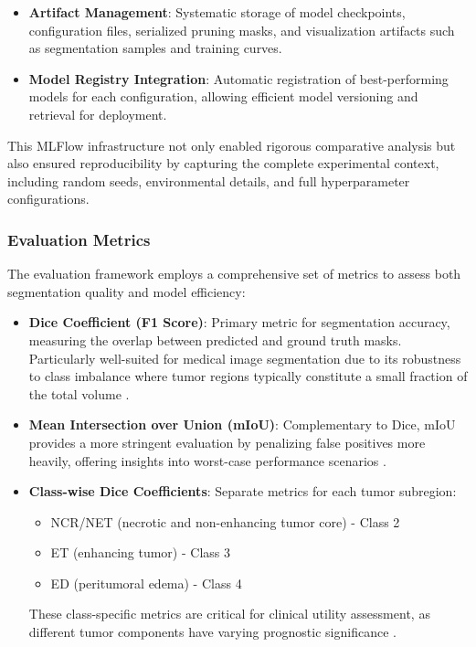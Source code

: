 \documentclass[12pt,a4paper]{article}
\begin{document}
\begin{enumerate}
\begin{itemize}
    \item \textbf{Artifact Management}: Systematic storage of model checkpoints, configuration files, serialized pruning masks, and visualization artifacts such as segmentation samples and training curves.
    
    \item \textbf{Model Registry Integration}: Automatic registration of best-performing models for each configuration, allowing efficient model versioning and retrieval for deployment.
\end{itemize}

This MLFlow infrastructure not only enabled rigorous comparative analysis but also ensured reproducibility by capturing the complete experimental context, including random seeds, environmental details, and full hyperparameter configurations.

\subsubsection{Evaluation Metrics}
The evaluation framework employs a comprehensive set of metrics to assess both segmentation quality and model efficiency:

\begin{itemize}
    \item \textbf{Dice Coefficient (F1 Score)}: Primary metric for segmentation accuracy, measuring the overlap between predicted and ground truth masks. Particularly well-suited for medical image segmentation due to its robustness to class imbalance where tumor regions typically constitute a small fraction of the total volume \cite{Sudre2017}.
    
    \item \textbf{Mean Intersection over Union (mIoU)}: Complementary to Dice, mIoU provides a more stringent evaluation by penalizing false positives more heavily, offering insights into worst-case performance scenarios \cite{Wang2023Review}.
    
    \item \textbf{Class-wise Dice Coefficients}: Separate metrics for each tumor subregion:
    \begin{itemize}
        \item NCR/NET (necrotic and non-enhancing tumor core) - Class 2
        \item ET (enhancing tumor) - Class 3 
        \item ED (peritumoral edema) - Class 4
    \end{itemize}
    These class-specific metrics are critical for clinical utility assessment, as different tumor components have varying prognostic significance \cite{Abidin2024}.
    

\end{itemize}
\end{enumerate}
\end{document}

